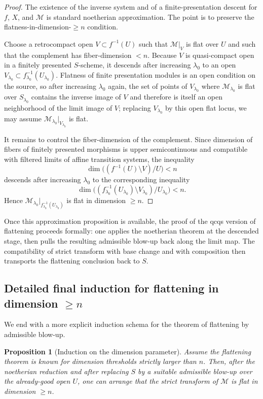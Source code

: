 \documentclass[11pt,oneside]{article}
\newtheorem{proposition}[theorem]{Proposition}
\newcommand{\M}{\mathcal M}
\begin{document}
\begin{proof}
The existence of the inverse system and of a finite-presentation descent for $f$, $X$, and $\M$ is standard noetherian approximation.  The point is to preserve the flatness-in-dimension-$\ge n$ condition.

Choose a retrocompact open $V\subset f^{-1}(U)$ such that $\M|_V$ is flat over $U$ and such that the complement has fiber-dimension $<n$.  Because $V$ is quasi-compact open in a finitely presented $S$-scheme, it descends after increasing $\lambda_0$ to an open $V_{\lambda_0}\subset f_{\lambda_0}^{-1}(U_{\lambda_0})$.  Flatness of finite presentation modules is an open condition on the source, so after increasing $\lambda_0$ again, the set of points of $V_{\lambda_0}$ where $\M_{\lambda_0}$ is flat over $S_{\lambda_0}$ contains the inverse image of $V$ and therefore is itself an open neighborhood of the limit image of $V$; replacing $V_{\lambda_0}$ by this open flat locus, we may assume $\M_{\lambda_0}|_{V_{\lambda_0}}$ is flat.

It remains to control the fiber-dimension of the complement.  Since dimension of fibers of finitely presented morphisms is upper semicontinuous and compatible with filtered limits of affine transition systems, the inequality
\[
\dim\bigl((f^{-1}(U)\setminus V)/U\bigr)<n
\]
descends after increasing $\lambda_0$ to the corresponding inequality
\[
\dim\bigl((f_{\lambda_0}^{-1}(U_{\lambda_0})\setminus V_{\lambda_0})/U_{\lambda_0}\bigr)<n.
\]
Hence $\M_{\lambda_0}|_{f_{\lambda_0}^{-1}(U_{\lambda_0})}$ is flat in dimension $\ge n$.
\end{proof}

Once this approximation proposition is available, the proof of the qcqs version of flattening proceeds formally: one applies the noetherian theorem at the descended stage, then pulls the resulting admissible blow-up back along the limit map.  The compatibility of strict transform with base change and with composition then transports the flattening conclusion back to $S$.

\subsection{Detailed final induction for flattening in dimension $\ge n$}

We end with a more explicit induction schema for the theorem of flattening by admissible blow-up.

\begin{proposition}[Induction on the dimension parameter]\label{prop:flattening-induction}
Assume the flattening theorem is known for dimension thresholds strictly larger than $n$.  Then, after the noetherian reduction and after replacing $S$ by a suitable admissible blow-up over the already-good open $U$, one can arrange that the strict transform of $\M$ is flat in dimension $\ge n$.
\end{proposition}
\end{document}
